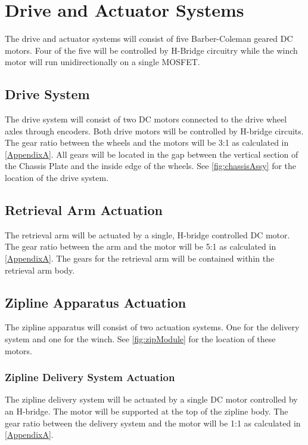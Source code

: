 \documentclass[11pt, oneside]{article} %
\begin{document}
	\newpage
	
\section{Drive and Actuator Systems}
The drive and actuator systems will consist of five Barber-Coleman geared DC motors. Four of the five will be controlled by H-Bridge circuitry while the winch motor will run unidirectionally on a single MOSFET.

	\subsection{Drive System}
	The drive system will consist of two DC motors connected to the drive wheel axles through encoders. Both drive motors will be controlled by H-bridge circuits. The gear ratio between the wheels and the motors will be 3:1 as calculated in \autoref{AppendixA}. All gears will be located in the gap between the vertical section of the Chassis Plate and the inside edge of the wheels. See \autoref{fig:chassisAssy} for the location of the drive system.
	
	\subsection{Retrieval Arm Actuation}
	The retrieval arm will be actuated by a single, H-bridge controlled DC motor. The gear ratio between the arm and the motor will be 5:1 as calculated in \autoref{AppendixA}. The gears for the retrieval arm will be contained within the retrieval arm body.
	
	\subsection{Zipline Apparatus Actuation}
	The zipline apparatus will consist of two actuation systems. One for the delivery system and one for the winch. See \autoref{fig:zipModule} for the location of these motors.
		
		\subsubsection{Zipline Delivery System Actuation}
		The zipline delivery system will be actuated by a single DC motor controlled by an H-bridge. The motor will be supported at the top of the zipline body. The gear ratio between the delivery system and the motor will be 1:1 as calculated in \autoref{AppendixA}.
		
\end{document}
